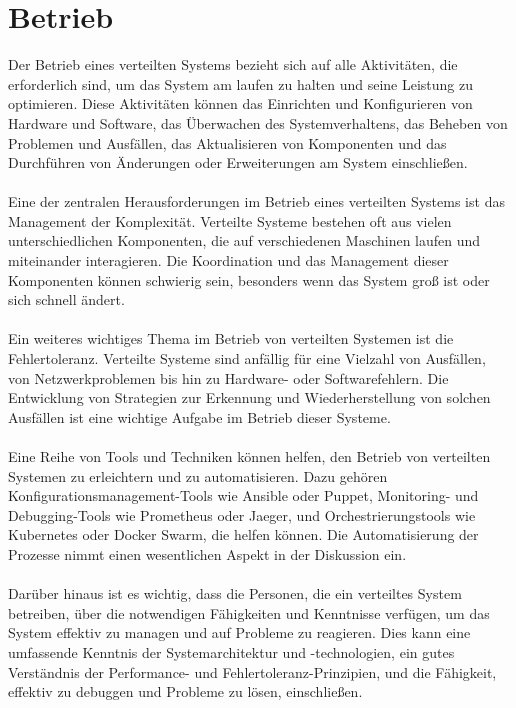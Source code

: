 \section{Betrieb}
Der Betrieb eines verteilten Systems bezieht sich auf alle Aktivitäten, die erforderlich sind, um das System am laufen zu halten und seine Leistung zu optimieren. Diese Aktivitäten können das Einrichten und Konfigurieren von Hardware und Software, das Überwachen des Systemverhaltens, das Beheben von Problemen und Ausfällen, das Aktualisieren von Komponenten und das Durchführen von Änderungen oder Erweiterungen am System einschließen.
\\\\
Eine der zentralen Herausforderungen im Betrieb eines verteilten Systems ist das Management der Komplexität. Verteilte Systeme bestehen oft aus vielen unterschiedlichen Komponenten, die auf verschiedenen Maschinen laufen und miteinander interagieren. Die Koordination und das Management dieser Komponenten können schwierig sein, besonders wenn das System groß ist oder sich schnell ändert.
\\\\
Ein weiteres wichtiges Thema im Betrieb von verteilten Systemen ist die Fehlertoleranz. Verteilte Systeme sind anfällig für eine Vielzahl von Ausfällen, von Netzwerkproblemen bis hin zu Hardware- oder Softwarefehlern. Die Entwicklung von Strategien zur Erkennung und Wiederherstellung von solchen Ausfällen ist eine wichtige Aufgabe im Betrieb dieser Systeme.
\\\\
Eine Reihe von Tools und Techniken können helfen, den Betrieb von verteilten Systemen zu erleichtern und zu automatisieren. Dazu gehören Konfigurationsmanagement-Tools wie Ansible oder Puppet, Monitoring- und Debugging-Tools wie Prometheus oder Jaeger, und Orchestrierungstools wie Kubernetes oder Docker Swarm, die helfen können. Die Automatisierung der Prozesse nimmt einen wesentlichen Aspekt in der Diskussion ein.
\\\\
Darüber hinaus ist es wichtig, dass die Personen, die ein verteiltes System betreiben, über die notwendigen Fähigkeiten und Kenntnisse verfügen, um das System effektiv zu managen und auf Probleme zu reagieren. Dies kann eine umfassende Kenntnis der Systemarchitektur und -technologien, ein gutes Verständnis der Performance- und Fehlertoleranz-Prinzipien, und die Fähigkeit, effektiv zu debuggen und Probleme zu lösen, einschließen.

